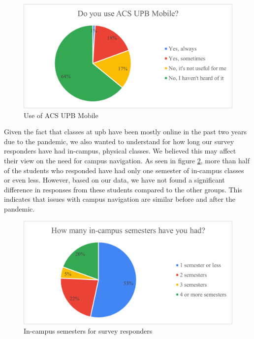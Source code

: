         \begin{figure}[!ht]
            \centering
            \includegraphics[width=\textwidth]{figures/charts/acs_upb_mobile.png}
            \caption{Use of ACS UPB Mobile}
            \label{4:fig:acs_upb_mobile}
        \end{figure}
        
        Given the fact that classes at \acrshort{upb} have been mostly online in the past two years due to the pandemic, we also wanted to understand for how long our survey responders have had in-campus, physical classes. We believed this may affect their view on the need for campus navigation. As seen in figure \ref{4:fig:semesters}, more than half of the students who responded have had only one semester of in-campus classes or even less. However, based on our data, we have not found a significant difference in responses from these students compared to the other groups. This indicates that issues with campus navigation are similar before and after the pandemic.
            
        \begin{figure}[!ht]
            \centering
            \includegraphics[width=\textwidth]{figures/charts/semesters.png}
            \caption{In-campus semesters for survey responders}
            \label{4:fig:semesters}
        \end{figure}
        
